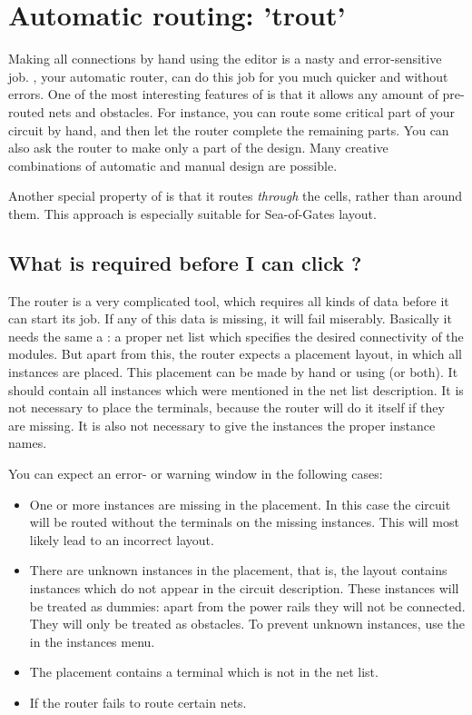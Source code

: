 
\chapter{Automatic routing: 'trout'}
\label{routeman}
Making all connections by hand using the editor is a nasty and error-sensitive
job. , your automatic router, can do this job for you much quicker
and without errors.  One of the most interesting features of  is
that it allows any amount of pre-routed nets and obstacles.  For instance, you
can route some critical part of your circuit by hand, and then let the router
complete the remaining parts. You can also ask the router to make only a part
of the design. Many creative combinations of automatic and manual design are
possible.

Another special property of  is that it routes {\em through} the
cells, rather than around them. This approach is especially suitable for
Sea-of-Gates layout.

\section{What is required before I can click \protect{}?}
The router is a very complicated tool, which requires all kinds of data before
it can start its job. If any of this data is missing, it will fail miserably.
Basically it needs the same a : a proper net list which
specifies the desired connectivity of the modules.  But apart from this, the
router expects a placement layout, in which all instances are placed. This
placement can be made by hand or using  (or both). It should
contain all instances which were mentioned in the net list description.  It is
not necessary to place the terminals, because the router will do it itself if
they are missing.  It is also not necessary to give the instances the proper
instance names.

You can expect an error- or warning window in the following
cases:
\begin{itemize}
\item
One or more instances are missing in the placement. In this
case the circuit will be routed without the terminals on
the missing instances. This will most likely lead to an
incorrect layout.
\item
There are unknown instances in the placement, that is, the
layout contains instances which do not appear in the
circuit description. These instances will be treated as
dummies: apart from the power rails they will not be
connected.  They will only be treated as obstacles.  To
prevent unknown instances, use the  in
the instances menu.
\item
The placement contains a terminal which is not in the net
list.
\item
If the router fails to route certain nets.
\end{itemize}

